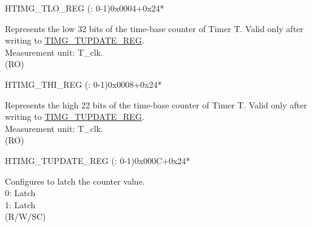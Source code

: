 \begin{register}{H}{TIMG\_TLO\_REG (: 0-1)}{0x0004+0x24*}\label{regdesc:TIMGTXLOREG}
%
\regnewline%
\begin{regdesc}\begin{reglist}
\label{fielddesc:TIMGTXLO}\item [TIMG\_T\regindex{x}\_LO]  Represents the low 32 bits of the time-base counter of Timer T. Valid only after writing to \hyperref[regdesc:TIMGTXUPDATEREG]{TIMG\_TUPDATE\_REG}. \\
Measurement unit: T\_clk. \\
(RO)
\end{reglist}\end{regdesc}
\end{register}


\begin{register}{H}{TIMG\_THI\_REG (: 0-1)}{0x0008+0x24*}\label{regdesc:TIMGTXHIREG}
%
%
\regnewline%
\begin{regdesc}\begin{reglist}
\label{fielddesc:TIMGTXHI}\item [TIMG\_T\regindex{x}\_HI] Represents the high 22 bits of the time-base counter of Timer T. Valid only after writing to \hyperref[regdesc:TIMGTXUPDATEREG]{TIMG\_TUPDATE\_REG}. \\
Measurement unit: T\_clk. \\
(RO)
\end{reglist}\end{regdesc}
\end{register}


\begin{register}{H}{TIMG\_TUPDATE\_REG (: 0-1)}{0x000C+0x24*}\label{regdesc:TIMGTXUPDATEREG}
%
%
\regnewline%
\begin{regdesc}\begin{reglist}
\label{fielddesc:TIMGTXUPDATE}\item [TIMG\_T\regindex{x}\_UPDATE]Configures to latch the counter value. \\
0: Latch \\
1: Latch \\
(R/W/SC)
\end{reglist}\end{regdesc}
\end{register}


